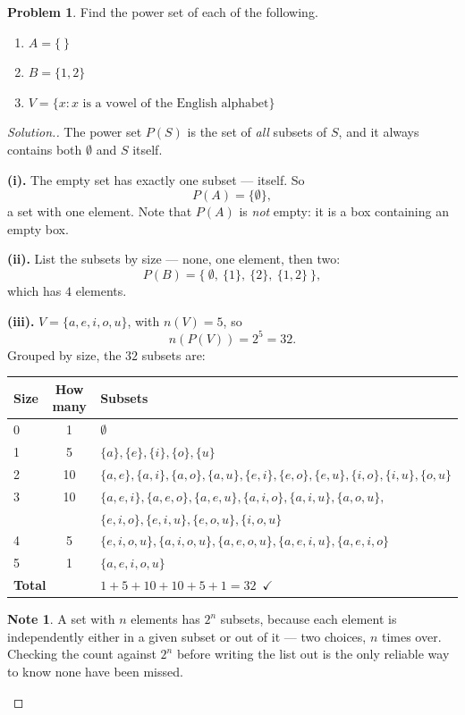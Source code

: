 \documentclass[11pt,a4paper]{article}
\theoremstyle{definition}
\newtheorem{note}[thm]{Note}
\newtheorem{problemx}{Problem}[section]
\newenvironment{problem}{\begin{problemx}}{\end{problemx}}
\newenvironment{solution}
  {\renewcommand{\qedsymbol}{}\begin{proof}[\textit{Solution}.]}
  {\end{proof}}
\let\amscheckmark\checkmark
\renewcommand{\checkmark}{\ensuremath{\amscheckmark}}
\begin{document}
\begin{problem}
Find the power set of each of the following.
\begin{enumerate}
\item[(i).] $A=\{\ \}$
\item[(ii).] $B=\{1,2\}$
\item[(iii).] $V=\{x: x \text{ is a vowel of the English alphabet}\}$
\end{enumerate}
\end{problem}

\begin{solution}
The power set $P(S)$ is the set of \emph{all} subsets of $S$, and it always contains
both $\emptyset$ and $S$ itself.

\textbf{(i).} The empty set has exactly one subset --- itself. So
$$P(A)=\{\emptyset\},$$
a set with one element. Note that $P(A)$ is \emph{not} empty: it is a box containing an
empty box.

\textbf{(ii).} List the subsets by size --- none, one element, then two:
$$P(B)=\Big\{\ \emptyset,\ \{1\},\ \{2\},\ \{1,2\}\ \Big\},$$
which has $4$ elements.

\textbf{(iii).} $V=\{a,e,i,o,u\}$, with $n(V)=5$, so
$$n\left(P(V)\right)=2^5=32.$$
Grouped by size, the $32$ subsets are:

\begin{table}[H]
\centering
\begin{tabular}{|l|c|l|}
\hline
Size & How many & Subsets\\
\hline
0 & 1 & $\emptyset$\\
1 & 5 & $\{a\},\{e\},\{i\},\{o\},\{u\}$\\
2 & 10 & $\{a,e\},\{a,i\},\{a,o\},\{a,u\},\{e,i\},\{e,o\},\{e,u\},\{i,o\},\{i,u\},\{o,u\}$\\
3 & 10 & $\{a,e,i\},\{a,e,o\},\{a,e,u\},\{a,i,o\},\{a,i,u\},\{a,o,u\},$\\
  &    & $\{e,i,o\},\{e,i,u\},\{e,o,u\},\{i,o,u\}$\\
4 & 5 & $\{e,i,o,u\},\{a,i,o,u\},\{a,e,o,u\},\{a,e,i,u\},\{a,e,i,o\}$\\
5 & 1 & $\{a,e,i,o,u\}$\\
\hline
\multicolumn{2}{|l|}{\textbf{Total}} & $1+5+10+10+5+1=32$\ \checkmark\\
\hline
\end{tabular}
\end{table}

\begin{note}
A set with $n$ elements has $2^n$ subsets, because each element is independently either
in a given subset or out of it --- two choices, $n$ times over. Checking the count
against $2^n$ before writing the list out is the only reliable way to know none have been
missed.
\end{note}
\end{solution}
\end{document}
